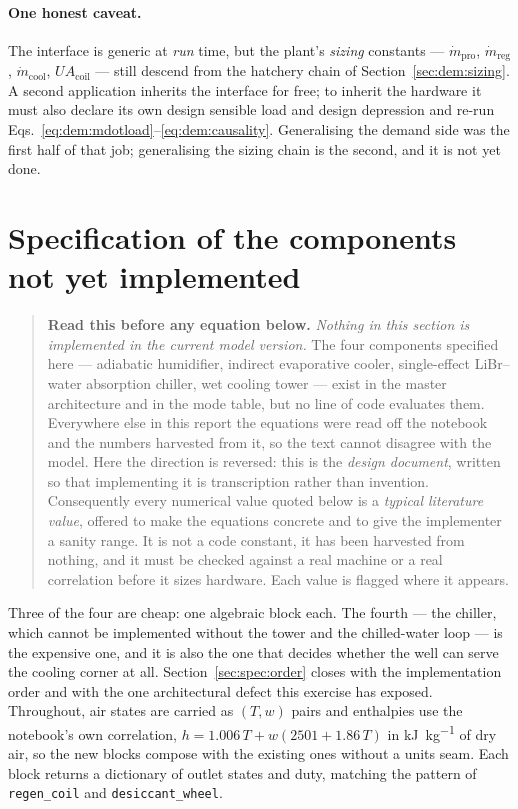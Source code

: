 \documentclass[11pt]{article}
\newcommand{\md}{\ensuremath{\dot m}}
\newcommand{\mdp}{\ensuremath{\dot m_{\mathrm{pro}}}}
\newcommand{\mdr}{\ensuremath{\dot m_{\mathrm{reg}}}}
\newcommand{\UA}{\ensuremath{U\!A}}
\begin{document}
\paragraph{One honest caveat.} The interface is generic at \emph{run} time, but
the plant's \emph{sizing} constants --- $\mdp$, $\mdr$, $\md_{\mathrm{cool}}$,
$\UA_{\mathrm{coil}}$ --- still descend from the hatchery chain of
Section~\ref{sec:dem:sizing}. A second application inherits the interface for
free; to inherit the hardware it must also declare its own design sensible load
and design depression and re-run Eqs.~\eqref{eq:dem:mdotload}--\eqref{eq:dem:causality}.
Generalising the demand side was the first half of that job; generalising the
sizing chain is the second, and it is not yet done.

\section{Specification of the components not yet implemented}\label{sec:spec:top}
\label{sec:spec:pending}

\begin{quote}
\textbf{Read this before any equation below.} \emph{Nothing in this section is implemented in the
current model version.} The four components specified here --- adiabatic humidifier, indirect
evaporative cooler, single-effect LiBr--water absorption chiller, wet cooling tower --- exist in the
master architecture and in the mode table, but no line of code evaluates them. Everywhere else in
this report the equations were read off the notebook and the numbers harvested from it, so the text
cannot disagree with the model. Here the direction is reversed: this is the \emph{design document},
written so that implementing it is transcription rather than invention. Consequently every numerical
value quoted below is a \emph{typical literature value}, offered to make the equations concrete and
to give the implementer a sanity range. It is not a code constant, it has been harvested from
nothing, and it must be checked against a real machine or a real correlation before it sizes
hardware. Each value is flagged where it appears.
\end{quote}

Three of the four are cheap: one algebraic block each. The fourth --- the chiller, which cannot be
implemented without the tower and the chilled-water loop --- is the expensive one, and it is also the
one that decides whether the well can serve the cooling corner at all.
Section~\ref{sec:spec:order} closes with the implementation order and with the one architectural
defect this exercise has exposed. Throughout, air states are carried as $(T,w)$ pairs and enthalpies
use the notebook's own correlation, $h = 1.006\,T + w(2501 + 1.86\,T)$ in
\si{\kilo\joule\per\kilogram} of dry air, so the new blocks compose with the existing ones without a
units seam. Each block returns a dictionary of outlet states and duty, matching the pattern of
\texttt{regen\_coil} and \texttt{desiccant\_wheel}.
\end{document}
